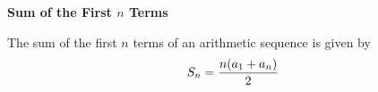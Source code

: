 {\bf Sum of the First $n$ Terms}
\vskip 6pt

The sum of the first $n$ terms of an arithmetic sequence is given by $$S_n={{n(a_1+a_n)}\over 2}$$

\vfill\eject
